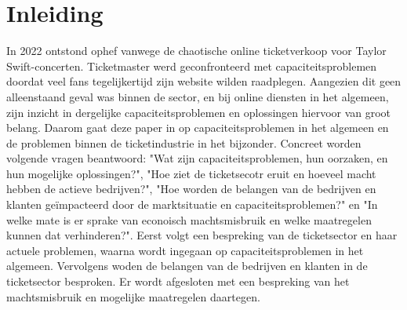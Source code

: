 
\section{Inleiding}

In 2022 ontstond ophef vanwege de chaotische online ticketverkoop voor
Taylor Swift-concerten. Ticketmaster %
werd geconfronteerd met capaciteitsproblemen doordat veel fans %
tegelijkertijd zijn website wilden raadplegen. Aangezien dit geen alleenstaand
geval was binnen de sector, en bij online diensten in het algemeen, zijn inzicht in 
dergelijke capaciteitsproblemen en oplossingen hiervoor van groot belang. %
Daarom gaat deze paper in op capaciteitsproblemen in het algemeen en de problemen
binnen de ticketindustrie in het bijzonder. Concreet worden volgende vragen
beantwoord: "Wat zijn capaciteitsproblemen, hun oorzaken, en hun mogelijke
oplossingen?", "Hoe ziet de ticketsecotr eruit en hoeveel macht hebben de
actieve bedrijven?", "Hoe worden de belangen van de bedrijven en klanten
geïmpacteerd door de marktsituatie en capaciteitsproblemen?" en
"In welke mate is er sprake van econoisch machtsmisbruik en welke maatregelen
kunnen dat verhinderen?". Eerst volgt een bespreking van de ticketsector en
haar actuele problemen, waarna wordt ingegaan op capaciteitsproblemen
in het algemeen. Vervolgens woden de belangen van de bedrijven en klanten
in de ticketsector besproken. Er wordt afgesloten met een bespreking van het
machtsmisbruik en mogelijke maatregelen daartegen.